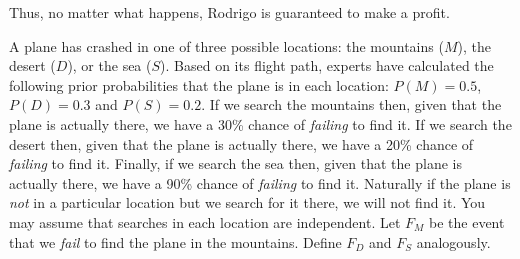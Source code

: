 \documentclass[addpoints,12pt]{exam}
\begin{document}
\begin{questions}
\begin{parts}
\begin{solution}[1.5in]
  Thus, no matter what happens, Rodrigo is guaranteed to make a profit.
\end{solution}

\end{parts}

\newpage
{}

\question A plane has crashed in one of three possible locations: the mountains ($M$), the desert ($D$), or the sea ($S$).
Based on its flight path, experts have calculated the following prior probabilities that the plane is in each location: $P(M) = 0.5$, $P(D) = 0.3$ and $P(S) = 0.2$.
If we search the mountains then, given that the plane is actually there, we have a 30\% chance of \emph{failing} to find it.
If we search the desert then, given that the plane is actually there, we have a 20\% chance of \emph{failing} to find it.
Finally, if we search the sea then, given that the plane is actually there, we have a 90\% chance of \emph{failing} to find it. 
Naturally if the plane is \emph{not} in a particular location but we search for it there, we will not find it.
You may assume that searches in each location are independent.
Let $F_M$ be the event that we \emph{fail} to find the plane in the mountains.
Define $F_D$ and $F_S$ analogously.
\end{questions}
\end{document}
